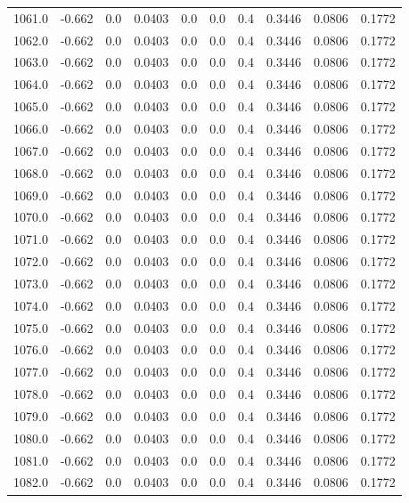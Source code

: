 \begin{longtable}{lrrrrrrrrr}
1061.0 & -0.662 & 0.0 & 0.0403 & 0.0 & 0.0 & 0.4 & 0.3446 & 0.0806 & 0.1772 \\
1062.0 & -0.662 & 0.0 & 0.0403 & 0.0 & 0.0 & 0.4 & 0.3446 & 0.0806 & 0.1772 \\
1063.0 & -0.662 & 0.0 & 0.0403 & 0.0 & 0.0 & 0.4 & 0.3446 & 0.0806 & 0.1772 \\
1064.0 & -0.662 & 0.0 & 0.0403 & 0.0 & 0.0 & 0.4 & 0.3446 & 0.0806 & 0.1772 \\
1065.0 & -0.662 & 0.0 & 0.0403 & 0.0 & 0.0 & 0.4 & 0.3446 & 0.0806 & 0.1772 \\
1066.0 & -0.662 & 0.0 & 0.0403 & 0.0 & 0.0 & 0.4 & 0.3446 & 0.0806 & 0.1772 \\
1067.0 & -0.662 & 0.0 & 0.0403 & 0.0 & 0.0 & 0.4 & 0.3446 & 0.0806 & 0.1772 \\
1068.0 & -0.662 & 0.0 & 0.0403 & 0.0 & 0.0 & 0.4 & 0.3446 & 0.0806 & 0.1772 \\
1069.0 & -0.662 & 0.0 & 0.0403 & 0.0 & 0.0 & 0.4 & 0.3446 & 0.0806 & 0.1772 \\
1070.0 & -0.662 & 0.0 & 0.0403 & 0.0 & 0.0 & 0.4 & 0.3446 & 0.0806 & 0.1772 \\
1071.0 & -0.662 & 0.0 & 0.0403 & 0.0 & 0.0 & 0.4 & 0.3446 & 0.0806 & 0.1772 \\
1072.0 & -0.662 & 0.0 & 0.0403 & 0.0 & 0.0 & 0.4 & 0.3446 & 0.0806 & 0.1772 \\
1073.0 & -0.662 & 0.0 & 0.0403 & 0.0 & 0.0 & 0.4 & 0.3446 & 0.0806 & 0.1772 \\
1074.0 & -0.662 & 0.0 & 0.0403 & 0.0 & 0.0 & 0.4 & 0.3446 & 0.0806 & 0.1772 \\
1075.0 & -0.662 & 0.0 & 0.0403 & 0.0 & 0.0 & 0.4 & 0.3446 & 0.0806 & 0.1772 \\
1076.0 & -0.662 & 0.0 & 0.0403 & 0.0 & 0.0 & 0.4 & 0.3446 & 0.0806 & 0.1772 \\
1077.0 & -0.662 & 0.0 & 0.0403 & 0.0 & 0.0 & 0.4 & 0.3446 & 0.0806 & 0.1772 \\
1078.0 & -0.662 & 0.0 & 0.0403 & 0.0 & 0.0 & 0.4 & 0.3446 & 0.0806 & 0.1772 \\
1079.0 & -0.662 & 0.0 & 0.0403 & 0.0 & 0.0 & 0.4 & 0.3446 & 0.0806 & 0.1772 \\
1080.0 & -0.662 & 0.0 & 0.0403 & 0.0 & 0.0 & 0.4 & 0.3446 & 0.0806 & 0.1772 \\
1081.0 & -0.662 & 0.0 & 0.0403 & 0.0 & 0.0 & 0.4 & 0.3446 & 0.0806 & 0.1772 \\
1082.0 & -0.662 & 0.0 & 0.0403 & 0.0 & 0.0 & 0.4 & 0.3446 & 0.0806 & 0.1772 \\

\end{longtable}
